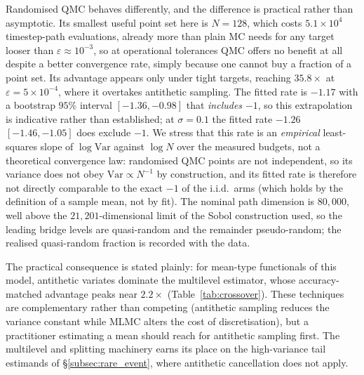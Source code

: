 \documentclass{ieeeaccess}
\begin{document}
Randomised QMC behaves differently, and the difference is practical rather than asymptotic. Its
smallest useful point set here is $N{=}128$, which costs $5.1\times10^{4}$ timestep-path
evaluations, already more than plain MC needs for any target looser than
$\varepsilon\approx10^{-3}$, so at operational tolerances QMC offers no benefit at all despite a
better convergence rate, simply because one cannot buy a fraction of a point set. Its advantage
appears only under tight targets, reaching $35.8\times$ at $\varepsilon{=}5\times10^{-4}$, where
it overtakes antithetic sampling. The fitted rate is $-1.17$ with a bootstrap $95\%$ interval
$[-1.36,-0.98]$ that \emph{includes} $-1$, so this extrapolation is indicative rather than
established; at $\sigma{=}0.1$ the fitted rate $-1.26$ $[-1.46,-1.05]$ does exclude $-1$. We
stress that this rate is an \emph{empirical} least-squares slope of $\log\mathrm{Var}$ against
$\log N$ over the measured budgets, not a theoretical convergence law: randomised QMC points are
not independent, so its variance does not obey $\mathrm{Var}\propto N^{-1}$ by construction, and
its fitted rate is therefore not directly comparable to the exact $-1$ of the i.i.d.\ arms
(which holds by the definition of a sample mean, not by fit). The
nominal path dimension is $80{,}000$, well above the $21{,}201$-dimensional limit of the Sobol
construction used, so the leading bridge levels are quasi-random and the remainder
pseudo-random; the realised quasi-random fraction is recorded with the data.

The practical consequence is stated plainly: for mean-type functionals of this model, antithetic
variates dominate the multilevel estimator, whose accuracy-matched advantage peaks near
$2.2\times$ (Table~\ref{tab:crossover}). These techniques are complementary rather than
competing (antithetic sampling reduces the variance constant while MLMC alters the cost of
discretisation), but a
practitioner estimating a mean should reach for antithetic sampling first. The multilevel and
splitting machinery earns its place on the high-variance tail estimands of
\S\ref{subsec:rare_event}, where antithetic cancellation does not apply.
\end{document}
